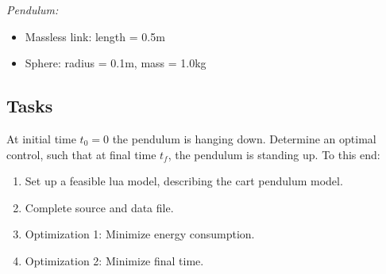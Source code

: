 \documentclass[a4paper,english,12pt]{report}
\begin{document}
\emph{Pendulum:}
\begin{itemize}
 \item Massless link: length = 0.5m
 \item Sphere: radius = 0.1m, mass = 1.0kg
\end{itemize}


\subsection*{Tasks}

At initial time $t_0=0$ the pendulum is hanging down. Determine an optimal control, such that at final time $t_f$, the pendulum is standing up. To this end:

\begin{enumerate}
	\item Set up a feasible lua model, describing the cart pendulum model.
	\item Complete source and data file.
	\item Optimization 1: Minimize energy consumption.
	\item Optimization 2: Minimize final time.
\end{enumerate}
\medskip
\end{document}
